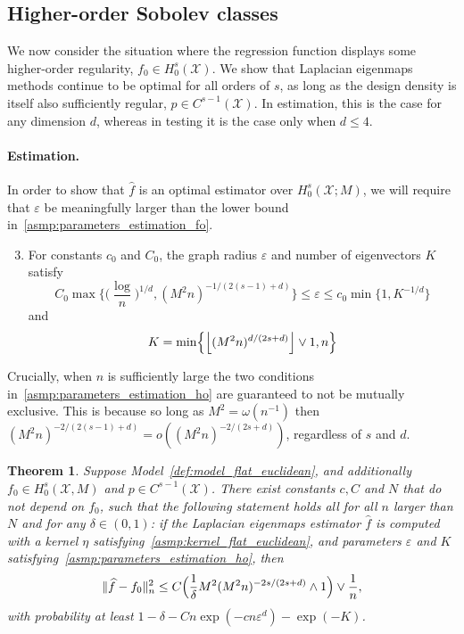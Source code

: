 \documentclass{article}
\newcommand{\floor}[1]{\left\lfloor #1 \right\rfloor}
\newcommand{\1}{\mathbf{1}}
\newcommand{\mc}[1]{\mathcal{#1}}
\newcommand{\wh}[1]{\widehat{#1}}
\theoremstyle{alden}
\theoremstyle{aldenthm}
\newtheorem{theorem}{Theorem}
\theoremstyle{definition}
\theoremstyle{remark}
\begin{document}
\subsection{Higher-order Sobolev classes}
\label{sec:higher_order_sobolev_classes}
We now consider the situation where the regression function displays some higher-order regularity, $f_0 \in H_0^s(\mc{X})$. We show that Laplacian eigenmaps methods continue to be optimal for all orders of $s$, as long as the design density is itself also sufficiently regular, $p \in C^{s - 1}(\mc{X})$. In estimation, this is the case for any dimension $d$, whereas in testing it is the case only when $d \leq 4$. 

\paragraph{Estimation.}
In order to show that $\wh{f}$ is an optimal estimator over $H_0^s(\mc{X};M)$, we will require that $\varepsilon$ be meaningfully larger than the lower bound in~\ref{asmp:parameters_estimation_fo}.
\begin{enumerate}[label=(P\arabic*)]
	\setcounter{enumi}{2}
	\item 
	\label{asmp:parameters_estimation_ho}
	For constants $c_0$ and $C_0$, the graph radius $\varepsilon$ and number of eigenvectors $K$ satisfy
	\begin{equation}
	\label{eqn:radius_ho}
	C_0\max\biggl\{\biggl(\frac{\log}{n}\biggr)^{1/d}, (M^2n)^{-1/(2(s - 1) + d)}\biggr\} \leq \varepsilon \leq c_0\min\{1, K^{-1/d}\}
	\end{equation}
	and
	\begin{equation*}
	K = \min\Bigl\{\floor{(M^2n)^{d/(2s + d)}} \vee 1,n\Bigr\}
	\end{equation*}
\end{enumerate}
Crucially, when $n$ is sufficiently large the two conditions in~\ref{asmp:parameters_estimation_ho} are guaranteed to not be mutually exclusive. This is because so long as $M^2 = \omega(n^{-1})$ then $(M^2n)^{-2/(2(s - 1) + d)} = o((M^2n)^{-2/(2s + d)})$, regardless of $s$ and $d$.
\begin{theorem}
	\label{thm:laplacian_eigenmaps_estimation_ho}
	Suppose Model~\ref{def:model_flat_euclidean}, and additionally $f_0 \in H_0^s(\mc{X},M)$ and $p \in C^{s - 1}(\mc{X})$. There exist constants $c,C$ and $N$ that do not depend on $f_0$, such that the following statement holds all for all $n$ larger than $N$ and for any $\delta \in (0,1)$: if the Laplacian eigenmaps estimator $\wh{f}$ is computed with a kernel $\eta$ satisfying~\ref{asmp:kernel_flat_euclidean}, and parameters $\varepsilon$ and $K$ satisfying~\ref{asmp:parameters_estimation_ho}, then
	\begin{equation}
	\label{eqn:laplacian_eigenmaps_estimation_ho}
	\|\wh{f} - f_0\|_n^2 \leq C\Bigl(\frac{1}{\delta}M^2(M^2n)^{-2s/(2s + d)} \wedge 1\Bigr) \vee \frac{1}{n},
	\end{equation}
	with probability at least $1 - \delta - Cn\exp(-cn\varepsilon^d) - \exp(-K)$.
\end{theorem}
\end{document}
